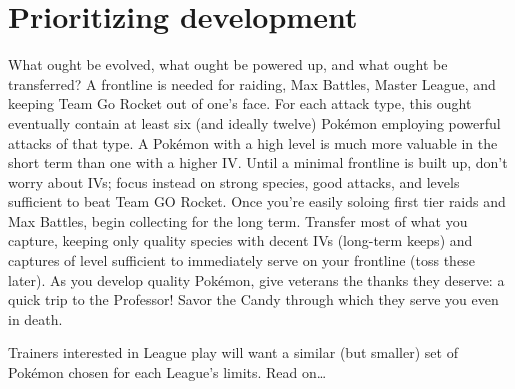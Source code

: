 \section{Prioritizing development\label{sec:developmentpriority}}
What ought be evolved, what ought be powered up, and what ought be transferred?
A frontline is needed for raiding, Max Battles, Master League, and keeping Team Go Rocket out of one's face.
For each attack type, this ought eventually contain at least six (and ideally twelve) Pokémon
  employing powerful attacks of that type.
A Pokémon with a high level is much more valuable in the short term than one with a higher IV.
Until a minimal frontline is built up, don't worry about IVs; focus instead on strong species,
  good attacks, and levels sufficient to beat Team GO Rocket.
Once you're easily soloing first tier raids and Max Battles, begin collecting for the long term.
Transfer most of what you capture, keeping only quality species with decent IVs (long-term keeps)
  and captures of level sufficient to immediately serve on your frontline (toss these later).
As you develop quality Pokémon, give veterans the thanks they deserve: a quick trip to the Professor!
Savor the Candy through which they serve you even in death.

Trainers interested in League play will want a similar (but smaller) set of Pokémon chosen for each League's \CP{} limits.
Read on\ldots
